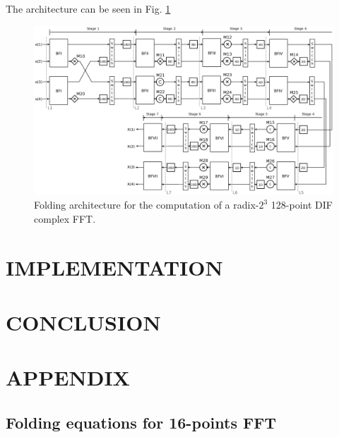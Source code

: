 \documentclass[a4paper, 10pt, conference]{ieeeconf}
\begin{document}
The architecture can be seen in Fig. \ref{fig:circ-folding-128}

\begin{figure}[ht!]
\centering
 \includegraphics[width=0.95\linewidth]{Diagramas/folding-128.eps}%
\caption{Folding architecture for the computation of a radix-$2^3$ 128-point DIF complex FFT.}
\label{fig:circ-folding-128}
\end{figure}


\section{IMPLEMENTATION}

\section{CONCLUSION}

\newpage
\section*{APPENDIX}
\subsection{Folding equations for 16-points FFT}
\end{document}
